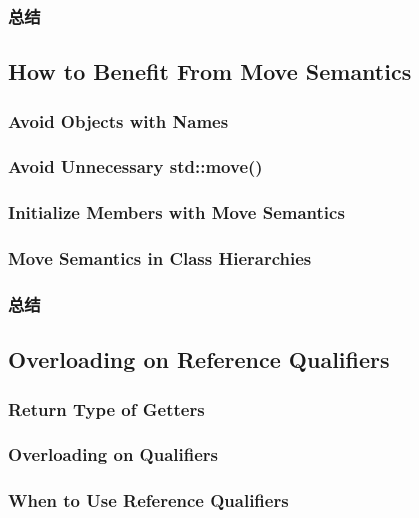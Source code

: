 \documentclass[11pt,a4paper,UTF8]{ctexart}
\begin{document}
		\subsubsection{总结}
	\subsection{How to Benefit From Move Semantics}
		\subsubsection{Avoid Objects with Names}
		\subsubsection{Avoid Unnecessary std::move()}
		\subsubsection{Initialize Members with Move Semantics}
		\subsubsection{Move Semantics in Class Hierarchies}
		\subsubsection{总结}
	\subsection{Overloading on Reference Qualifiers}
		\subsubsection{Return Type of Getters}
		\subsubsection{Overloading on Qualifiers}
		\subsubsection{When to Use Reference Qualifiers}
\end{document}
